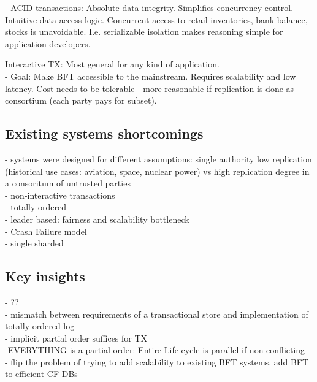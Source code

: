 - ACID transactions: Absolute data integrity. Simplifies concurrency control. Intuitive data access logic.
Concurrent access to retail inventories,  bank balance, stocks is unavoidable. I.e. serializable isolation makes reasoning simple for application developers.

 Interactive TX: Most general for any kind of application.
\\
 - Goal: Make BFT accessible to the mainstream. Requires scalability and low latency. Cost needs to be tolerable - more reasonable if replication is done as consortium (each party pays for subset).

\subsection{Existing systems shortcomings}
- systems were designed for different assumptions: single authority low replication (historical use cases: aviation, space, nuclear power) vs high replication degree in a consoritum of untrusted parties\\
- non-interactive transactions\\
- totally ordered\\
- leader based: fairness and scalability bottleneck \\
- Crash Failure model\\
- single sharded\\

\subsection{Key insights}
- ?? \\
- mismatch between requirements of a transactional store and implementation of totally ordered log\\
- implicit partial order suffices for TX 
\\
-EVERYTHING is a partial order: Entire Life cycle is parallel if non-conflicting\\

- flip the problem of trying to add scalability to existing BFT systems. add BFT to efficient CF DBs\\

